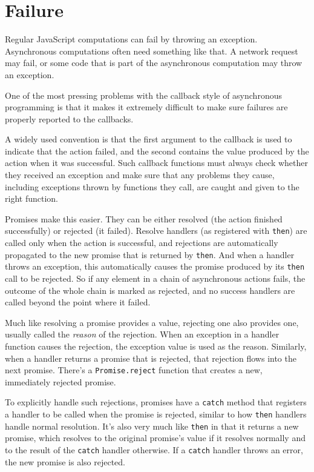 \section{Failure}

Regular JavaScript computations can fail by throwing an exception. Asynchronous computations often need something like that. A network request may fail, or some code that is part of the asynchronous computation may throw an exception.

One of the most pressing problems with the callback style of asynchronous programming is that it makes it extremely difficult to make sure failures are properly reported to the callbacks.

A widely used convention is that the first argument to the callback is used to indicate that the action failed, and the second contains the value produced by the action when it was successful. Such callback functions must always check whether they received an exception and make sure that any problems they cause, including exceptions thrown by functions they call, are caught and given to the right function.

Promises make this easier. They can be either resolved (the action finished successfully) or rejected (it failed). Resolve handlers (as registered with \lstinline`then`) are called only when the action is successful, and rejections are automatically propagated to the new promise that is returned by \lstinline`then`. And when a handler throws an exception, this automatically causes the promise produced by its \lstinline`then` call to be rejected. So if any element in a chain of asynchronous actions fails, the outcome of the whole chain is marked as rejected, and no success handlers are called beyond the point where it failed.

Much like resolving a promise provides a value, rejecting one also provides one, usually called the \emph{reason} of the rejection. When an exception in a handler function causes the rejection, the exception value is used as the reason. Similarly, when a handler returns a promise that is rejected, that rejection flows into the next promise. There's a \lstinline`Promise.reject` function that creates a new, immediately rejected promise.

To explicitly handle such rejections, promises have a \lstinline`catch` method that registers a handler to be called when the promise is rejected, similar to how \lstinline`then` handlers handle normal resolution. It's also very much like \lstinline`then` in that it returns a new promise, which resolves to the original promise's value if it resolves normally and to the result of the \lstinline`catch` handler otherwise. If a \lstinline`catch` handler throws an error, the new promise is also rejected.

